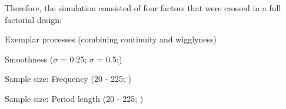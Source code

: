 Therefore, the simulation consisted of four factors that were crossed in a
full factorial design:

\begin{APAenumerate}
    \item Exemplar processes (combining continuity and wigglyness)
    \item Smoothness ($\sigma$ = 0.25; $\sigma$ = 0.5;)
    \item Sample size: Frequency (20 - 225; \textcite{wrzus_ecological_2023})
    \item Sample size: Period length (20 - 225;
    \textcite{wrzus_ecological_2023})
\end{APAenumerate}